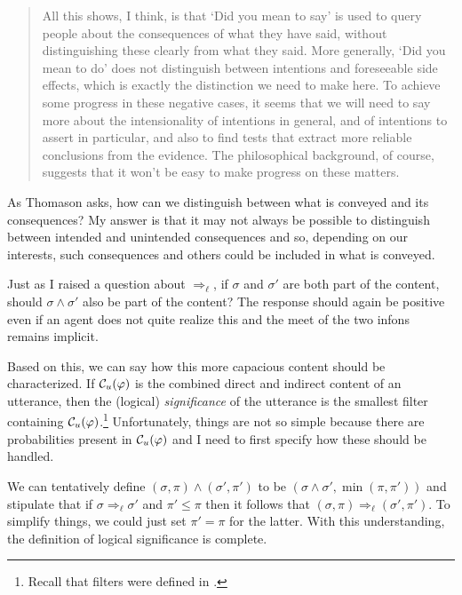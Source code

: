 \begin{quote}
All this shows, I think, is that `Did you mean to say' is used to query people about the consequences of what they have said, without distinguishing these clearly from what they said. More generally, `Did you mean to do' does not distinguish between intentions and foreseeable side effects, which is exactly the distinction we need to make here. To achieve some progress in these negative cases, it seems that we will need to say more about the intensionality of intentions in general, and of intentions to assert in particular, and also to find tests that extract more reliable conclusions from the evidence. The philosophical background, of course, suggests that it won't be easy to make progress on these matters.
\end{quote}

As Thomason asks, how can we distinguish between what is conveyed and its consequences? My answer is that it may not always be possible to distinguish between intended and unintended consequences and so, depending on our interests, such consequences and others could be included in what is conveyed. 


Just as I raised a question about $\Rightarrow_{\ell}$, if $\sigma$ and $\sigma'$ are both part of the content, should $\sigma \wedge \sigma'$ also be part of the content? The response should again be positive even if an agent does not quite realize this and the meet of the two infons remains implicit.

Based on this, we can say how this more capacious content should be characterized. If ${\cal C}_u(\varphi)$ is the combined direct and indirect content of an utterance, then the (logical) \emph{significance} of the utterance is the smallest filter containing ${\cal C}_u(\varphi)$.\footnote{Recall that filters were defined in .} Unfortunately, things are not so simple because there are probabilities present in ${\cal C}_u(\varphi)$ and I need to first specify how these should be handled.

We can tentatively define $(\sigma,\pi) \wedge (\sigma',\pi')$ to be $(\sigma \wedge \sigma', \min(\pi,\pi'))$ and stipulate that if $\sigma \Rightarrow_{\ell} \sigma'$ and $\pi' \leq \pi$ then it follows that $(\sigma, \pi) \Rightarrow_{\ell} (\sigma', \pi')$. To simplify things, we could just set $\pi' = \pi$ for the latter. With this understanding, the definition of logical significance is complete.


